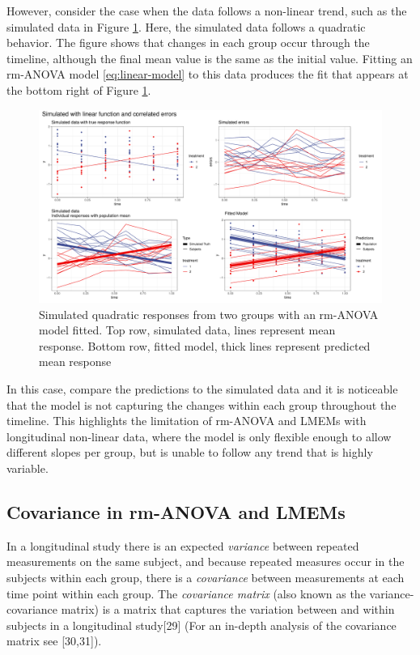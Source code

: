 \documentclass[
]{article}
\begin{document}
However, consider the case when the data follows a non-linear trend, such as the simulated data in Figure \ref{fig:quadratic-response}. Here, the simulated data follows a quadratic behavior. The figure shows that changes in each group occur through the timeline, although the final mean value is the same as the initial value. Fitting an rm-ANOVA model \eqref{eq:linear-model} to this data produces the fit that appears at the bottom right of Figure \ref{fig:quadratic-response}.

\begin{figure}
\includegraphics[width=1\linewidth]{Manuscript_AM_v2_files/figure-latex/quadratic-response-1} \caption{Simulated quadratic responses from two groups with an rm-ANOVA model fitted. Top row, simulated data, lines represent mean response. Bottom row, fitted model, thick lines represent predicted mean response}\label{fig:quadratic-response}
\end{figure}

In this case, compare the predictions to the simulated data and it is noticeable that the model is not capturing the changes within each group throughout the timeline. This highlights the limitation of rm-ANOVA and LMEMs with longitudinal non-linear data, where the model is only flexible enough to allow different slopes per group, but is unable to follow any trend that is highly variable.

\hypertarget{covariance-in-rm-anova-and-lmems}{%
\subsection{Covariance in rm-ANOVA and LMEMs}\label{covariance-in-rm-anova-and-lmems}}

In a longitudinal study there is an expected \emph{variance} between repeated measurements on the same subject, and because repeated measures occur in the subjects within each group, there is a \emph{covariance} between measurements at each time point within each group. The \emph{covariance matrix} (also known as the variance-covariance matrix) is a matrix that captures the variation between and within subjects in a longitudinal study{[}29{]} (For an in-depth analysis of the covariance matrix see {[}30,31{]}).
\end{document}
